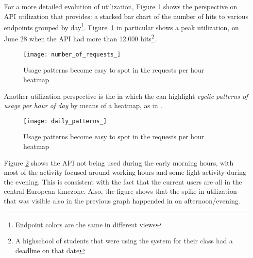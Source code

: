\niceseparator


  For a more detailed evolution of utilization, Figure \ref{fig:aeu} shows the  perspective on API utilization that \tool provides: a stacked bar chart of the number of hits to various endpoints grouped by day\footnote{Endpoint colors are the same in different views}. Figure~\ref{fig:aeu} in particular shows a peak utilization, on June 28 when the API had more than 12.000 hits\footnote{A highschool of students that were using the system for their class had a deadline on that date}. 

    \begin{figure}[!ht]
    \centering
    \texttt{[image: number\_of\_requests\_]}
    \caption{Usage patterns become easy to spot in the requests per hour heatmap}
    \label{fig:aeu}
    \end{figure}


\niceseparator


  Another utilization perspective is the  in which  the \tool can highlight {\em cyclic patterns of usage per hour of day} by means of a heatmap, as in . 


    \begin{figure}[!ht]
      \centering
      \texttt{[image: daily\_patterns\_]}
      \caption{Usage patterns become easy to spot in the requests per hour heatmap}
      \label{fig:dp}
    \end{figure}


  Figure \ref{fig:dp} shows the API not being used during the early morning hours, with most of the activity focused around working hours and some light activity during the evening. This is consistent with the fact that the current users are all in the central European timezone. Also, the figure shows that the spike in utilization that was visible also in the previous graph happended in on afternoon/evening.






